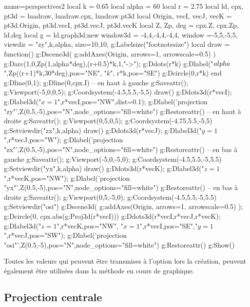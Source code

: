 \begin{center}
\begin{luadraw}{name=perspectives2}
local k = 0.65
local alpha = 60
local r = 2.75
local ld, cpx, pt3d = luadraw, luadraw.cpx, luadraw.pt3d
local Origin, vecI, vecJ, vecK = pt3d.Origin, pt3d.vecI, pt3d.vecJ, pt3d.vecK 
local Z, Zp, deg = cpx.Z, cpx.Zp, ld.deg
local g = ld.graph3d:new{
    window3d = {-4,4,-4,4,-4,4},
    window ={-5,5,-5,5},
    viewdir = {"zy",k,alpha},
    size={10,10},
}
g:Labelsize("footnotesize")
local draw = function()
    g:Dscene3d( g:addAxes(Origin, {arrows=1, arrowscale=0.5}) )
    g:Darc(1,0,Zp(1,alpha*deg),(r+0.5)*k,1,"->"); g:Ddots(r*k)
    g:Dlabel("$\\alpha$",Zp((r+1)*k,30*deg),{pos="NE"}, "$k$", r*k,{pos="SE"})
    g:Dcircle(0,r*k)
end
g:Dline(0,1); g:Dline(0,cpx.I)
-- en haut à gauche
g:Saveattr(); g:Viewport(-5,0,0,5); g:Coordsystem(-4.5,5.5,-5,5)
draw()
g:Ddots3d(r*vecI); g:Dlabel3d("$x=1$",r*vecI,{pos="NW",dist=0.1}); 
g:Dlabel('projection "zy"',Z(0.5,-5),{pos="N",node_options="fill=white"})
g:Restoreattr()
-- en haut à droite
g:Saveattr(); g:Viewport(0,5,0,5); g:Coordsystem(-4.75,5.5,-5,5)
g:Setviewdir({"zx",k,alpha})
draw()
g:Ddots3d(r*vecJ); g:Dlabel3d("$y=1$",r*vecJ,{pos="W"}); 
g:Dlabel('projection "zx"',Z(0.5,-5),{pos="N",node_options="fill=white"})
g:Restoreattr()
-- en bas à gauche
g:Saveattr(); g:Viewport(-5,0,-5,0); g:Coordsystem(-4.5,5.5,-5,5.5)
g:Setviewdir({"yx",k,alpha})
draw()
g:Ddots3d(r*vecK); g:Dlabel3d("$z=1$",r*vecK,{pos="NW"}); 
g:Dlabel('projection "yx"',Z(0.5,-5),{pos="N",node_options="fill=white"})
g:Restoreattr()
-- en bas à droite
g:Saveattr(); g:Viewport(0,5,-5,0); g:Coordsystem(-4.5,5.5,-5,5.5)
g:Setviewdir("osi")
g:Dscene3d( g:addAxes(Origin, {arrows=1, arrowscale=0.5}) ); g:Dcircle(0, cpx.abs(g:Proj3d(r*vecI)))
g:Ddots3d({r*vecI,r*vecJ,r*vecK}); 
g:Dlabel3d("$z=1$",r*vecK,{pos="NW"}, "$x=1$",r*vecI,{pos="SE"},"$y=1$",r*vecJ,{pos="SW"});
g:Dlabel('projection "osi"',Z(0.5,-5),{pos="N",node_options="fill=white"})
g:Restoreattr()
g:Show()
\end{luadraw}
\end{center}

Toutes les valeurs qui peuvent être transmises à l'option  lors la création, peuvent également être utilisées dans la méthode  en cours de graphique.

\subsection{Projection centrale}

